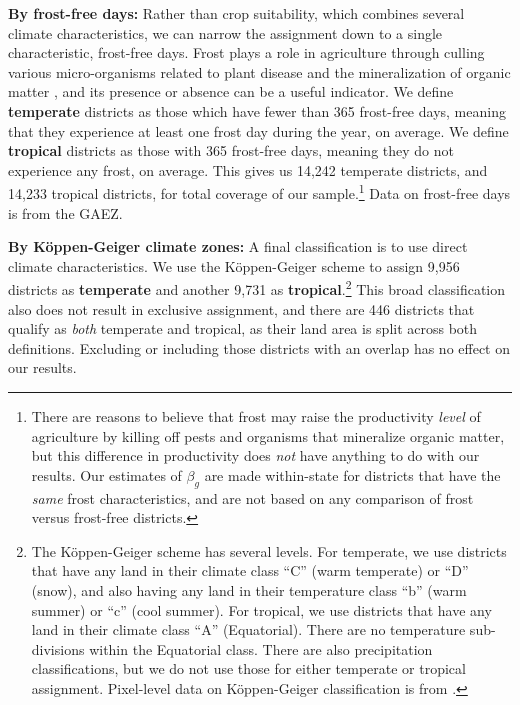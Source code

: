 \documentclass[12pt]{article}
\begin{document}
\vspace{.5cm}\noindent\textbf{By frost-free days:} Rather than crop suitability, which combines several climate characteristics, we can narrow the assignment down to a single characteristic, frost-free days. Frost plays a role in agriculture through culling various micro-organisms related to plant disease and the mineralization of organic matter \citep{Masters:2001kl}, and its presence or absence can be a useful indicator. We define \textbf{temperate} districts as those which have fewer than 365 frost-free days, meaning that they experience at least one frost day during the year, on average. We define \textbf{tropical} districts as those with 365 frost-free days, meaning they do not experience any frost, on average. This gives us 14,242 temperate districts, and 14,233 tropical districts, for total coverage of our sample.\footnote{There are reasons to believe that frost may raise the productivity \textit{level} of agriculture by killing off pests and organisms that mineralize organic matter, but this difference in productivity does \textit{not} have anything to do with our results. Our estimates of $\beta_g$ are made within-state for districts that have the \textit{same} frost characteristics, and are not based on any comparison of frost versus frost-free districts.} Data on frost-free days is from the GAEZ.

\vspace{.5cm}\noindent\textbf{By K{\"o}ppen-Geiger climate zones:} A final classification is to use direct climate characteristics. We use the K{\"o}ppen-Geiger scheme to assign 9,956 districts as \textbf{temperate} and another 9,731 as \textbf{tropical}.\footnote{The K{\"o}ppen-Geiger scheme has several levels. For temperate, we use districts that have any land in their climate class ``C'' (warm temperate) or ``D'' (snow), and also having any land in their temperature class ``b'' (warm summer) or ``c'' (cool summer). For tropical, we use districts that have any land in their climate class ``A'' (Equatorial). There are no temperature sub-divisions within the Equatorial class. There are also precipitation classifications, but we do not use those for either temperate or tropical assignment. Pixel-level data on K{\"o}ppen-Geiger classification is from \cite{kottek2006}.} This broad classification also does not result in exclusive assignment, and there are 446 districts that qualify as \textit{both} temperate and tropical, as their land area is split across both definitions. Excluding or including those districts with an overlap has no effect on our results.
\end{document}
